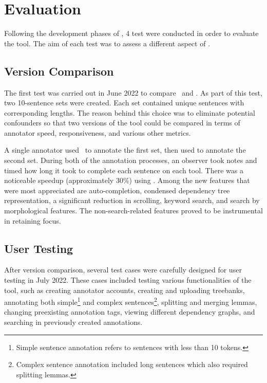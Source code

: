 \section{Evaluation}
\label{sec:evaluation}

Following the development phases of \boatvtwo, 4 test were conducted in order to evaluate the tool.
The aim of each test was to assess a different aspect of \boatvtwo.

\subsection{Version Comparison}
The first test was carried out in June 2022 to compare \boatvone\ and \boatvtwo.
As part of this test, two 10-sentence sets were created.
Each set contained unique sentences with corresponding lengths.
The reason behind this choice was to eliminate potential confounders so that two versions of the tool could be compared in terms of annotator speed, responsiveness, and various other metrics.

A single annotator used \boatvone\ to annotate the first set, then used \boatvtwo to annotate the second set.
During both of the annotation processes, an observer took notes and timed how long it took to complete each sentence on each tool.
There was a noticeable speedup (approximately 30\%) using \boatvtwo.
Among the new features that were most appreciated are auto-completion, condensed dependency tree representation, a significant reduction in scrolling, keyword search, and search by morphological features.
The non-search-related features proved to be instrumental in retaining focus.

\subsection{User Testing}
After version comparison, several test cases were carefully designed for user testing in July 2022.
These cases included testing various functionalities of the tool, such as creating annotator accounts, creating and uploading treebanks, annotating both simple\footnote{Simple sentence annotation refers to sentences with less than 10 tokens.} and complex sentences\footnote{Complex sentence annotation included long sentences which also required splitting lemmas.}, splitting and merging lemmas, changing preexisting annotation tags, viewing different dependency graphs, and searching in previously created annotations.

